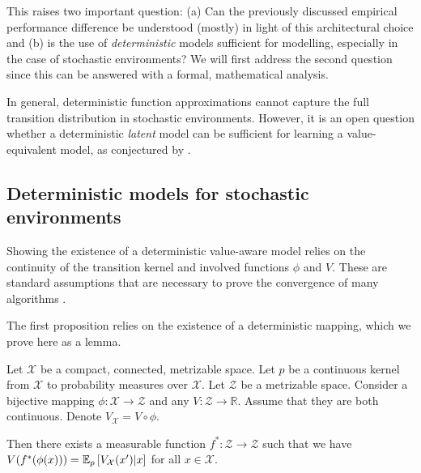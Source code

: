 This raises two important question: (a) Can the previously discussed empirical performance difference be understood (mostly) in light of this architectural choice and (b) is the use of \emph{deterministic} models sufficient for modelling, especially in the case of stochastic environments?
We will first address the second question since this can be answered with a formal, mathematical analysis. 

In general, deterministic function approximations cannot capture the full transition distribution in stochastic environments.
However, it is an open question whether a deterministic \emph{latent} model can be sufficient for learning a value-equivalent model, as conjectured by \textcite{oh2017value}.

\subsection{Deterministic models for stochastic environments}

Showing the existence of a deterministic value-aware model relies on the continuity of the transition kernel and involved functions $\phi$ and $V$.
These are standard assumptions that are necessary to prove the convergence of many algorithms \parencite{bertsekasshreve1978}. 


The first proposition relies on the existence of a deterministic mapping, which we prove here as a lemma.


\begin{lemma}
\label{lem:cvaml:deterministic_representation_lemma}
    Let $\mathcal{X}$ be a compact, connected, metrizable space. Let $p$ be a continuous kernel from $\mathcal{X}$ to probability measures over $\mathcal{X}$. Let $\mathcal{Z}$ be a metrizable space. Consider a bijective mapping $\phi: \mathcal{X} \rightarrow \mathcal{Z}$ and any $V: \mathcal{Z} \rightarrow \mathbb{R}$. Assume that they are both continuous. Denote $V_\mathcal{X} = V \circ \phi$.
    
    Then there exists a measurable function $f^*: \mathcal{Z} \rightarrow \mathcal{Z}$ such that we have $V(f^*(\phi(x))) = \mathbb{E}_{p}\left[  V_\mathcal{X}(x')|x \right]$ for all $x \in \mathcal{X}$.
\end{lemma}

